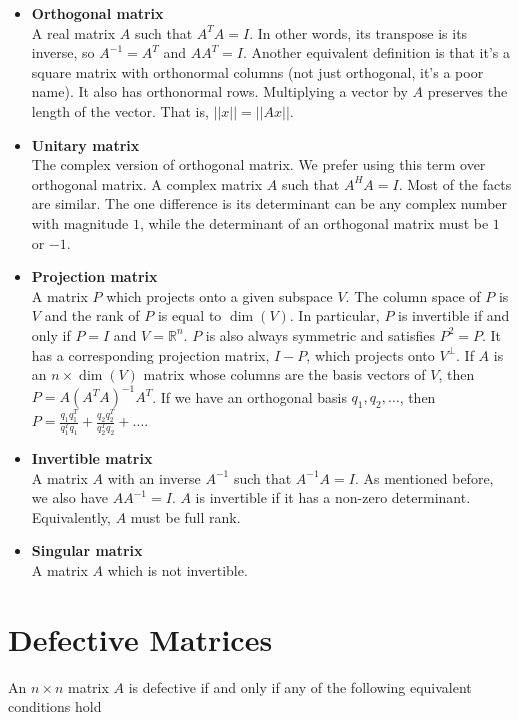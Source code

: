 \documentclass[11pt]{article}
\theoremstyle{plain} %
\theoremstyle{definition}
\theoremstyle{remark}
\begin{document}
\begin{itemize}
\item \textbf{Orthogonal matrix}\\
A real matrix $A$ such that $A^TA = I$. In other words, its transpose is its inverse, so $A^{-1} = A^T$ and $AA^T = I$. Another equivalent definition is that it's a square matrix with orthonormal columns (not just orthogonal, it's a poor name). It also has orthonormal rows. Multiplying a vector by $A$ preserves the length of the vector. That is, $||x|| = ||Ax||$.
\item \textbf{Unitary matrix}\\
The complex version of orthogonal matrix. We prefer using this term over orthogonal matrix. A complex matrix $A$ such that $A^HA = I$. Most of the facts are similar. The one difference is its determinant can be any complex number with magnitude $1$, while the determinant of an orthogonal matrix must be $1$ or $-1$.
\item \textbf{Projection matrix}\\
A matrix $P$ which projects onto a given subspace $V$. The column space of $P$ is $V$ and the rank of $P$ is equal to $\dim(V)$. In particular, $P$ is invertible if and only if $P = I$ and $V = \mathbb{R}^n$. $P$ is also always symmetric and satisfies $P^2 = P$. It has a corresponding projection matrix, $I-P$, which projects onto $V^{\perp}$. If $A$ is an $n \times \dim(V)$ matrix whose columns are the basis vectors of $V$, then $P = A(A^TA)^{-1}A^T$. If we have an orthogonal basis $q_1, q_2, \ldots$, then $P = \frac{q_1q_1^T}{q_1^Tq_1} + \frac{q_2q_2^T}{q_2^Tq_2} + \ldots$.
\item \textbf{Invertible matrix}\\
A matrix $A$ with an inverse $A^{-1}$ such that $A^{-1}A = I$. As mentioned before, we also have $AA^{-1} = I$. $A$ is invertible if it has a non-zero determinant. Equivalently, $A$ must be full rank.
\item \textbf{Singular matrix}\\
A matrix $A$ which is not invertible.
\end{itemize}

\clearpage

\section{Defective Matrices}

An $n \times n$ matrix $A$ is defective if and only if any of the following equivalent conditions hold
\end{document}
